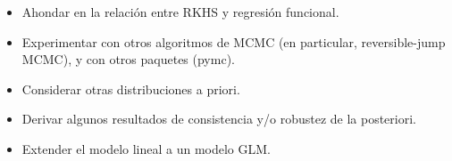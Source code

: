 \begin{outcomment}
  \begin{itemize}
    \item Ahondar en la relación entre RKHS y regresión funcional.
    \item Experimentar con otros algoritmos de MCMC (en particular, reversible-jump MCMC), y con otros paquetes (pymc).
    \item Considerar otras distribuciones a priori.
    \item Derivar algunos resultados de consistencia y/o robustez de la posteriori.
    \item Extender el modelo lineal a un modelo GLM.
  \end{itemize}
\end{outcomment}
